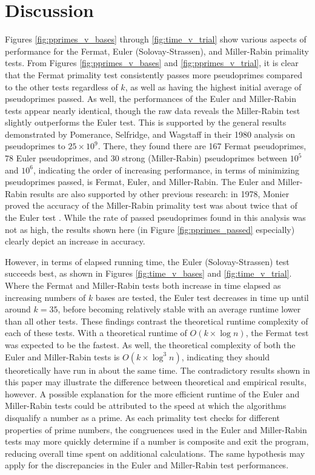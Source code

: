 \documentclass{article}
\begin{document}
\section{Discussion}
Figures \ref{fig:pprimes_v_bases} through \ref{fig:time_v_trial} show various aspects of performance for the Fermat, Euler (Solovay-Strassen), and Miller-Rabin primality tests. From Figures \ref{fig:pprimes_v_bases} and \ref{fig:pprimes_v_trial}, it is clear that the Fermat primality test consistently passes more pseudoprimes compared to the other tests regardless of $k$, as well as having the highest initial average of pseudoprimes passed. As well, the performances of the Euler and Miller-Rabin tests appear nearly identical, though the raw data reveals the Miller-Rabin test slightly outperforms the Euler test. This is supported by the general results demonstrated by Pomerance, Selfridge, and Wagstaff in their 1980 analysis on pseudoprimes to $25 \times 10^9$. There, they found there are 167 Fermat pseudoprimes, 78 Euler pseudoprimes, and 30 strong (Miller-Rabin) pseudoprimes between $10^5$ and $10^6$, indicating the order of increasing performance, in terms of minimizing pseudoprimes passed, is Fermat, Euler, and Miller-Rabin. The Euler and Miller-Rabin results are also supported by other previous research: in 1978, Monier proved the accuracy of the Miller-Rabin primality test was about twice that of the Euler test \cite{monier_evaluation_1980}. While the rate of passed pseudoprimes found in this analysis was not as high, the results shown here (in Figure \ref{fig:pprimes_passed} especially) clearly depict an increase in accuracy.

However, in terms of elapsed running time, the Euler (Solovay-Strassen) test succeeds best, as shown in Figures \ref{fig:time_v_bases} and \ref{fig:time_v_trial}. Where the Fermat and Miller-Rabin tests both increase in time elapsed as increasing numbers of $k$ bases are tested, the Euler test decreases in time up until around $k = 35$, before becoming relatively stable with an average runtime lower than all other tests. These findings contrast the theoretical runtime complexity of each of these tests. With a theoretical runtime of $O(k \times \log{n})$, the Fermat test was expected to be the fastest. As well, the theoretical complexity of both the Euler and Miller-Rabin tests is $O(k \times \log^3{n})$, indicating they should theoretically have run in about the same time. The contradictory results shown in this paper may illustrate the difference between theoretical and empirical results, however. A possible explanation for the more efficient runtime of the Euler and Miller-Rabin tests could be attributed to the speed at which the algorithms disqualify a number as a prime. As each primality test checks for different properties of prime numbers, the congruences used in the Euler and Miller-Rabin tests may more quickly determine if a number is composite and exit the program, reducing overall time spent on additional calculations. The same hypothesis may apply for the discrepancies in the Euler and Miller-Rabin test performances.
\end{document}
